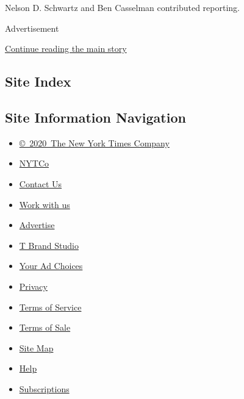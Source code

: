 Nelson D. Schwartz and Ben Casselman contributed reporting.

Advertisement

\protect\hyperlink{after-bottom}{Continue reading the main story}

\hypertarget{site-index}{%
\subsection{Site Index}\label{site-index}}

\hypertarget{site-information-navigation}{%
\subsection{Site Information
Navigation}\label{site-information-navigation}}

\begin{itemize}
\tightlist
\item
  \href{https://help.nytimes3xbfgragh.onion/hc/en-us/articles/115014792127-Copyright-notice}{©~2020~The
  New York Times Company}
\end{itemize}

\begin{itemize}
\tightlist
\item
  \href{https://www.nytco.com/}{NYTCo}
\item
  \href{https://help.nytimes3xbfgragh.onion/hc/en-us/articles/115015385887-Contact-Us}{Contact
  Us}
\item
  \href{https://www.nytco.com/careers/}{Work with us}
\item
  \href{https://nytmediakit.com/}{Advertise}
\item
  \href{http://www.tbrandstudio.com/}{T Brand Studio}
\item
  \href{https://www.nytimes3xbfgragh.onion/privacy/cookie-policy\#how-do-i-manage-trackers}{Your
  Ad Choices}
\item
  \href{https://www.nytimes3xbfgragh.onion/privacy}{Privacy}
\item
  \href{https://help.nytimes3xbfgragh.onion/hc/en-us/articles/115014893428-Terms-of-service}{Terms
  of Service}
\item
  \href{https://help.nytimes3xbfgragh.onion/hc/en-us/articles/115014893968-Terms-of-sale}{Terms
  of Sale}
\item
  \href{https://spiderbites.nytimes3xbfgragh.onion}{Site Map}
\item
  \href{https://help.nytimes3xbfgragh.onion/hc/en-us}{Help}
\item
  \href{https://www.nytimes3xbfgragh.onion/subscription?campaignId=37WXW}{Subscriptions}
\end{itemize}

